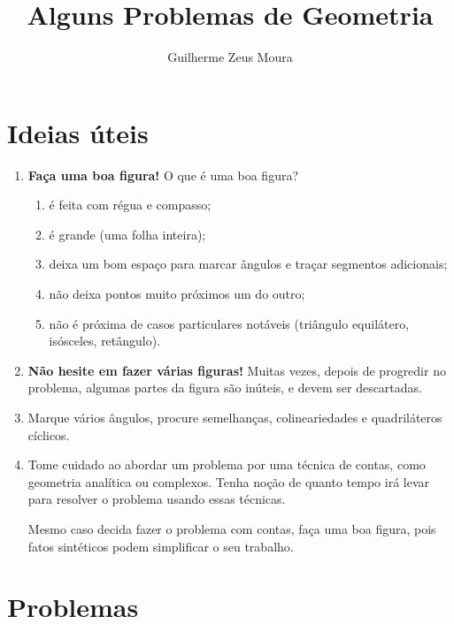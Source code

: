 \documentclass[10pt, a4paper]{article}
\title{Alguns Problemas de Geometria}
\author{Guilherme Zeus Moura}
\begin{document}
	
	\zeustitle
	\section{Ideias úteis}
	\begin{enumerate}[label = \textbullet]
		\item \textbf{Faça uma boa figura!} O que é uma boa figura?
		\begin{enumerate}[label = --]
			\item é feita com régua e compasso;
			\item é grande (uma folha inteira);
			\item deixa um bom espaço para marcar ângulos e traçar segmentos adicionais;
			\item não deixa pontos muito próximos um do outro;
			\item não é próxima de casos particulares notáveis (triângulo equilátero, isósceles, retângulo).
		\end{enumerate}
	\item \textbf{Não hesite em fazer várias figuras!} Muitas vezes, depois de progredir no problema, algumas partes da figura são inúteis, e devem ser descartadas.
	\item Marque vários ângulos, procure semelhanças, colineariedades e quadriláteros cíclicos.
	\item Tome cuidado ao abordar um problema por uma técnica de contas, como geometria analítica ou complexos. Tenha noção de quanto tempo irá levar para resolver o problema usando essas técnicas.

		Mesmo caso decida fazer o problema com contas, faça uma boa figura, pois fatos sintéticos podem simplificar o seu trabalho.
	\end{enumerate}
	\section{Problemas}
\end{document}
